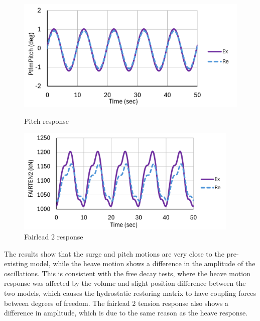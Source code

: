 \documentclass[a4paper, 11pt]{article}
\begin{document}
\begin{figure}[H]
    \begin{minipage}{0.48\textwidth}
        \centering
        \includegraphics[width=1\textwidth]{2.1_pitch_mine_1.png}
        \caption{\small Pitch response}
        \label{fig:2.1_pitch_mine_recreated}
    \end{minipage}
    \hfill
    \begin{minipage}{0.5\textwidth}
        \centering
        \includegraphics[width=0.95\textwidth]{2.1_fairten2_mine_1.png}
        \caption{\small Fairlead 2 response}
        \label{fig:2.1_fairten2_mine_recreated}
    \end{minipage}
\end{figure}

The results show that the surge and pitch motions are very close to the pre-existing model, while the heave motion shows a difference in the amplitude of the oscillations. This is consistent with the free decay tests, where the heave motion response was affected by the volume and slight position difference between the two models, which causes the hydrostatic restoring matrix to have coupling forces between degrees of freedom. The fairlead 2 tension response also shows a difference in amplitude, which is due to the same reason as the heave response.
\end{document}
